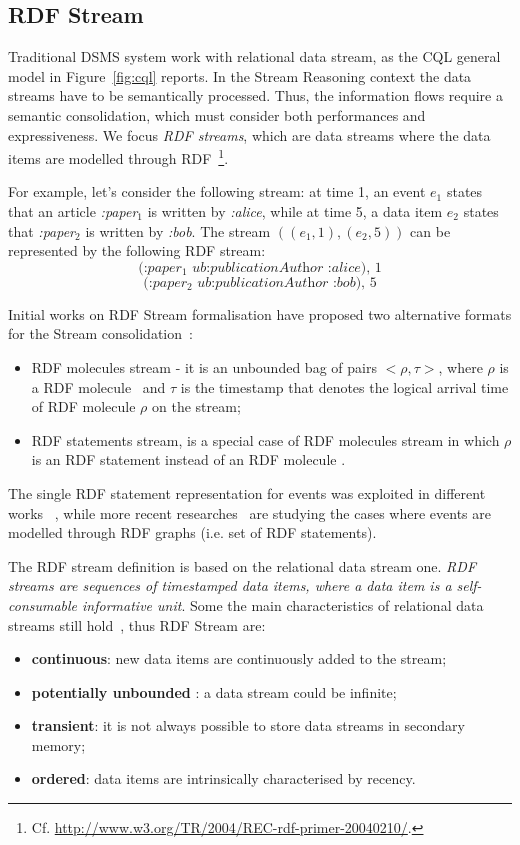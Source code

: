 \subsection{RDF Stream}\label{sec:rdfstream}

Traditional DSMS system work with relational data stream, as the CQL general model in Figure~\ref{fig:cql} reports. In the Stream Reasoning context the data streams have to be semantically processed. Thus, the information flows require a semantic consolidation, which must consider both performances and expressiveness. We focus \textit{RDF streams}, which are data streams where the data items are modelled through RDF~\footnote{Cf. \url{http://www.w3.org/TR/2004/REC-rdf-primer-20040210/}.}. 

For example, let's consider the following stream: at time 1, an event $e_1$ states that an article \textit{:paper$_1$} is written by \textit{:alice}, while at time 5, a data item $e_2$ states that \textit{:paper$_2$} is written by \textit{:bob}. The stream $((e_1,1),(e_2,5))$ can be represented by the following RDF stream:
\[\textit{(:paper$_1$ ub:publicationAuthor :alice), 1}\]
\[\textit{(:paper$_2$ ub:publicationAuthor :bob), 5}\]

Initial works on RDF Stream formalisation have proposed two alternative formats for the Stream consolidation~\cite{DBLP:conf/fis/ValleCBBC08}:
\begin{itemize}
\item RDF molecules stream - it is an unbounded bag of pairs $< \rho, \tau >$, where $\rho$ is a RDF molecule~\cite{TrackingMolecules} and $\tau$ is the timestamp that denotes the logical arrival time of RDF molecule $\rho$ on the stream;
\item RDF statements stream, is a special case of RDF molecules stream in which $\rho$ is an RDF statement instead of an RDF molecule  .
\end{itemize} 

The single RDF statement representation for events was exploited in different works ~\cite{Barbieri2010,Lephuoc2011}, while more recent researches~\cite{DBLP:conf/semweb/BalduiniVDTPC13} are studying the cases where events are modelled through RDF graphs (i.e. set of RDF statements). 

The  RDF stream  definition is based on the relational data stream one. \textit{RDF streams are sequences of timestamped data items, where a data item is a self- consumable informative unit}. Some the main characteristics of relational data streams still hold~\cite{DBLP:conf/pods/BabcockBDMW02}, thus RDF Stream are:
\begin{itemize}
\item \textbf{continuous}: new data items are continuously added to the stream;
\item \textbf{potentially unbounded} : a data stream could be infinite;
\item \textbf{transient}: it is not always possible to store data streams in secondary memory;
\item \textbf{ordered}: data items are intrinsically characterised by recency.
\end{itemize}


